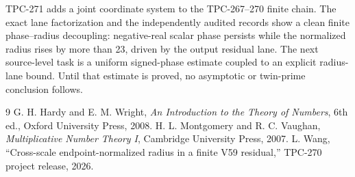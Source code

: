 \documentclass[11pt]{article}
\begin{document}
TPC-271 adds a joint coordinate system to the TPC-267--270 finite chain.  The
exact lane factorization and the independently audited records show a clean
finite phase--radius decoupling: negative-real scalar phase persists while the
normalized radius rises by more than 23, driven by the output residual lane.
The next source-level task is a uniform signed-phase estimate coupled to an
explicit radius-lane bound.  Until that estimate is proved, no asymptotic or
twin-prime conclusion follows.

\begin{thebibliography}{9}
G. H. Hardy and E. M. Wright, \emph{An Introduction to the Theory of Numbers},
6th ed., Oxford University Press, 2008.
H. L. Montgomery and R. C. Vaughan, \emph{Multiplicative Number Theory I},
Cambridge University Press, 2007.
L. Wang, ``Cross-scale endpoint-normalized radius in a finite V59 residual,''
TPC-270 project release, 2026.
\end{thebibliography}
\end{document}
